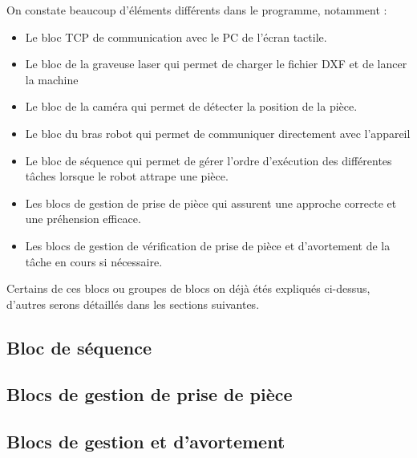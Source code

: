On constate beaucoup d'éléments différents dans le programme, notamment :
\begin{itemize}
    \item Le bloc TCP de communication avec le PC de l'écran tactile.
    \item Le bloc de la graveuse laser qui permet de charger le fichier DXF et de lancer la machine
    \item Le bloc de la caméra qui permet de détecter la position de la pièce.
    \item Le bloc du bras robot qui permet de communiquer directement avec l'appareil
    \item Le bloc de séquence qui permet de gérer l'ordre d'exécution des différentes tâches lorsque le robot attrape une pièce.
    \item Les blocs de gestion de prise de pièce qui assurent une approche correcte et une préhension efficace.
    \item Les blocs de gestion de vérification de prise de pièce et d'avortement de la tâche en cours si nécessaire.
\end{itemize}

Certains de ces blocs ou groupes de blocs on déjà étés expliqués ci-dessus, d'autres serons détaillés dans les sections suivantes.

\subsection{Bloc de séquence}

\subsection{Blocs de gestion de prise de pièce}

\subsection{Blocs de gestion et d'avortement}

